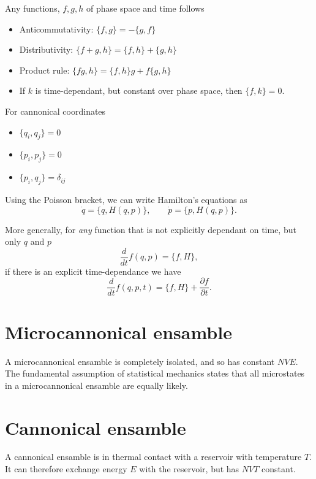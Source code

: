 \documentclass[a4paper, 11pt, notitlepage, english]{article}
\newcommand{\p}{\partial}
\begin{document}
Any functions, $f, g, h$ of phase space and time follows
\begin{itemize}
	\item Anticommutativity: $\{f, g\} = - \{g, f\}$
	\item Distributivity: $\{f+g, h\} = \{f, h\} + \{g, h\}$
	\item Product rule: $\{fg, h\} = \{f, h\}g + f\{g, h\}$
	\item If $k$ is time-dependant, but constant over phase space, then $\{f,k\} = 0$.
\end{itemize}
For cannonical coordinates
\begin{itemize}
	\item $\{q_i, q_j\} = 0$
	\item $\{p_i, p_j\} = 0$
	\item $\{p_i, q_j\} = \delta_{ij}$
\end{itemize}

Using the Poisson bracket, we can write Hamilton's equations as
$$\dot{q} = \{q, H(q,p)\}, \qquad \dot{p} = \{p, H(q,p)\}.$$

More generally, for \emph{any} function that is not explicitly dependant on time, but only $q$ and $p$
$$\frac{d}{dt}f(q,p) = \{f, H\},$$
if there is an explicit time-dependance we have
$$\frac{d}{dt}f(q,p,t) = \{f, H\} + \frac{\p f}{\p t}.$$

\clearpage

\section*{Microcannonical ensamble}
A microcannonical ensamble is completely isolated, and so has constant $NVE$. The fundamental assumption of statistical mechanics states that all microstates in a microcannonical ensamble are equally likely.

\section*{Cannonical ensamble}

A cannonical ensamble is in thermal contact with a reservoir with temperature $T$. It can therefore exchange energy $E$ with the reservoir, but has $NVT$ constant. 
\end{document}
